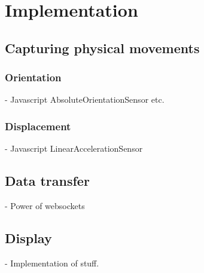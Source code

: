\section{Implementation}

\subsection{Capturing physical movements}
\subsubsection{Orientation}
- Javascript AbsoluteOrientationSensor etc.

\subsubsection{Displacement}
- Javascript LinearAccelerationSensor


\subsection{Data transfer}
- Power of websockets

\subsection{Display}
- Implementation of stuff.
